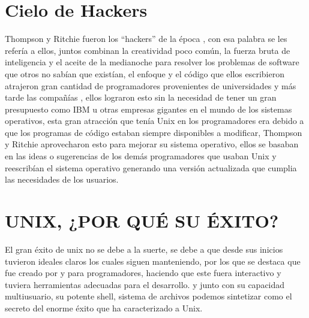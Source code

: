 \section*{Cielo de Hackers}
Thompson y Ritchie fueron los “hackers” de la época , con esa palabra se les refería a ellos, juntos combinan la creatividad poco común, la fuerza bruta de inteligencia y el aceite de la medianoche para resolver los problemas  de software que otros  no sabían que existían, el enfoque y el código que ellos escribieron atrajeron gran cantidad de programadores  provenientes de universidades y más tarde las  compañías , ellos  lograron esto  sin la necesidad de tener  un gran presupuesto como IBM u otras empresas 
gigantes en el mundo de los sistemas operativos,  esta gran atracción que tenía Unix en los programadores era debido  a que los programas de código estaban siempre  
disponibles a modificar, Thompson y Ritchie  aprovecharon esto para  mejorar su sistema operativo, ellos se basaban  en las ideas o sugerencias de los demás programadores  
que usaban Unix y reescribían el sistema operativo generando una versión actualizada que cumplia las necesidades de los usuarios.

\section*{UNIX, ¿POR QUÉ SU ÉXITO?}
El gran éxito de unix no se debe a la suerte, se debe a  que desde sus inicios tuvieron  ideales claros los cuales siguen manteniendo, por los que se destaca que fue creado 
por y para programadores,  haciendo que este fuera  interactivo y tuviera  herramientas adecuadas para el desarrollo. y junto con su capacidad multiusuario, su potente 
shell, sistema de archivos podemos sintetizar como el secreto del enorme éxito que ha caracterizado a Unix. 


 